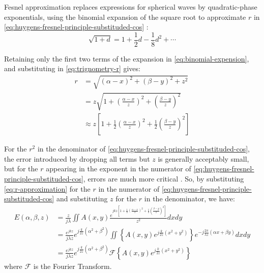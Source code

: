 Fesnel approximation replaces expressions for spherical waves by quadratic-phase exponentials, using the binomial expansion of the square root to approximate $r$ in \cref{eq:huygens-fresnel-principle-substituded-cos} \cite{Goodman2017}:
\begin{equation}
  \sqrt{1+d} = 1 + \frac{1}{2}d - \frac{1}{8}d^2 + \cdots \label{eq:binomial-expension}
\end{equation}

Retaining only the first two terms of the expansion in \cref{eq:binomial-expension}, and substituting in \cref{eq:trignometry-r} gives:
\begin{align}
  r & = \sqrt{(\alpha-x)^2 + (\beta-y)^2 + z^2}                                                                                                              \\
    & = z \sqrt{1 + \left( \frac{\alpha-x}{z} \right)^2 + \left(\frac{\beta-y}{z}\right)^2}                                                                  \\
    & \approx z \left[ 1 + \frac{1}{2} \left( \frac{\alpha-x}{z} \right)^2 + \frac{1}{2} \left(\frac{\beta-y}{z}\right)^2 \right] \label{eq:r-approximation}
\end{align}

For the $r^2$ in the denominator of \cref{eq:huygens-fresnel-principle-substituded-cos}, the error introduced by dropping all terms but $z$ is generally acceptably small, but for the $r$ appearing in the exponent in the numerator of \cref{eq:huygens-fresnel-principle-substituded-cos}, errors are much more critical \cite{Goodman2017}. So, by substituting \cref{eq:r-approximation} for the $r$ in the numerator of \cref{eq:huygens-fresnel-principle-substituded-cos} and substituting $z$ for the $r$ in the denominator, we have:
\begin{align}
  E(\alpha, \beta, z) & = \frac{z}{j\lambda} \iint A(x,y)\frac{e^{jkz \left[ 1 + \frac{1}{2} \left( \frac{\alpha-x}{z} \right)^2 + \frac{1}{2} \left(\frac{\beta-y}{z}\right)^2 \right]}}{z^2} dxdy \\
                      & = \frac{e^{jkz}}{j\lambda z} e^{j\frac{k}{2z}(\alpha^2+\beta^2)} \iint \left\{A(x,y)e^{j\frac{k}{2z}(x^2+y^2)}\right\}e^{-j\frac{2\pi}{\lambda z}(\alpha x+\beta y)}dxdy    \\
                      & = \frac{e^{jkz}}{j\lambda z} e^{j\frac{k}{2z}(\alpha^2+\beta^2)} \mathcal{F} \left\{A(x,y)e^{j\frac{k}{2z}(x^2+y^2)}\right\}
\end{align}
where $\mathcal{F}$ is the Fourier Transform.

